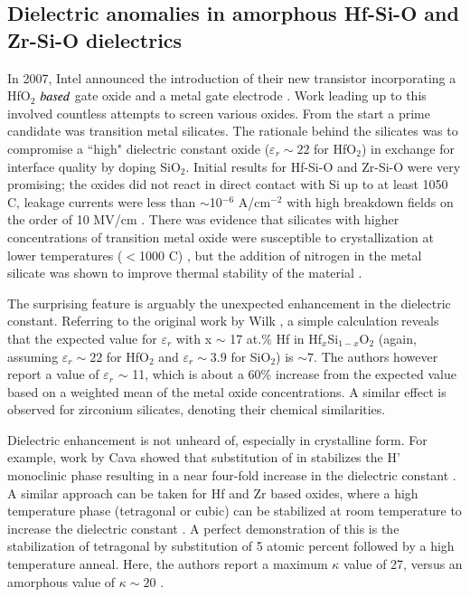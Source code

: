 \subsection{Dielectric anomalies in amorphous Hf-Si-O and Zr-Si-O dielectrics}

In 2007, Intel announced the introduction of their new transistor incorporating a HfO$_{2}$ $\emph{based}$ gate oxide and a metal gate electrode \cite{Mistry2007}. Work leading up to this involved countless attempts to screen various oxides. From the start a prime candidate was transition metal silicates. The rationale behind the silicates was to compromise a ``high" dielectric constant oxide ($\varepsilon_{r} \sim 22$ for HfO$_{2}$) in exchange for interface quality by doping SiO$_{2}$. Initial results for Hf-Si-O and Zr-Si-O were very promising; the oxides did not react in direct contact with Si up to at least 1050 \textdegree C, leakage currents were less than $\sim$10$^{-6}$ A/cm$^{-2}$ with high breakdown fields on the order of 10 MV/cm \cite{Wilk2000a}. There was evidence that silicates with higher concentrations of transition metal oxide were susceptible to crystallization at lower temperatures  ($<$1000 \textdegree C) \cite{Neumayer2001}, but the addition of nitrogen in the metal silicate was shown to improve thermal stability of the material \cite{Visokay2002}.

The surprising feature is arguably the unexpected enhancement in the dielectric constant. Referring to the original work by Wilk \cite{Wilk2000a}, a simple calculation reveals that the expected value for $\varepsilon_{r}$ with x $\sim$ 17 at.\% Hf in Hf$_{x}$Si$_{1-x}$O$_{2}$ (again, assuming $\varepsilon_{r} \sim 22$ for HfO$_{2}$ and $\varepsilon_{r} \sim 3.9 $ for SiO$_{2}$) is $\sim7$. The authors however report a value of $\varepsilon_{r}$ $\sim$ 11, which is about a 60\% increase from the expected value based on a weighted mean of the metal oxide concentrations. A similar effect is observed for zirconium silicates, denoting their chemical similarities.  

Dielectric enhancement is not unheard of, especially in crystalline form. For example, work by Cava showed that substitution of  in  stabilizes the H' monoclinic phase resulting in a near four-fold increase in the dielectric constant \cite{Cava1995}. A similar approach can be taken for Hf and Zr based oxides, where a high temperature phase (tetragonal or cubic) can be stabilized at room temperature to increase the dielectric constant \cite{Chalker2008a, Fischer2008b, Park2006}. A perfect demonstration of this is the stabilization of tetragonal  by substitution of 5 atomic percent  followed by a high temperature anneal. Here, the authors report a maximum $\kappa$ value of 27, versus an amorphous value of $\kappa \sim 20 $ \cite{Tomida2006}.

